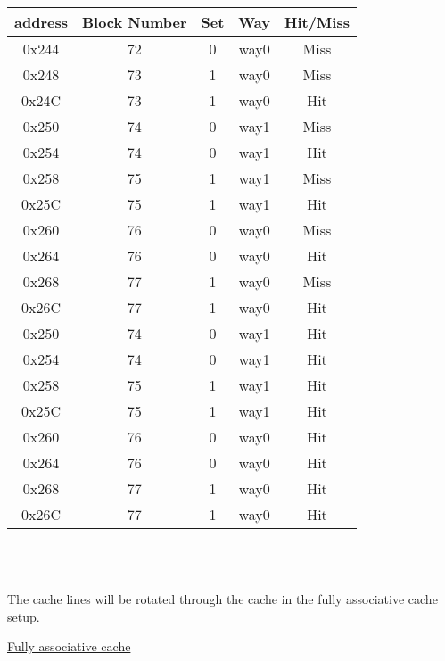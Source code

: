 \documentclass[11pt,reqno]{article}
\begin{document}
\begin{tabular}{| c | c | c | c | c |}
\hline
address & Block Number & Set & Way & Hit/Miss \\ \hline
0x244 & 72 & 0 & way0 & Miss \\ \hline
0x248 & 73 & 1 & way0 & Miss \\ \hline
0x24C & 73 & 1 & way0 & Hit \\ \hline
0x250 & 74 & 0 & way1 & Miss \\ \hline
0x254 & 74 & 0 & way1 & Hit \\ \hline
0x258 & 75 & 1 & way1 & Miss \\ \hline
0x25C & 75 & 1 & way1 & Hit \\ \hline
0x260 & 76 & 0 & way0 & Miss \\ \hline
0x264 & 76 & 0 & way0 & Hit \\ \hline
0x268 & 77 & 1 & way0 & Miss \\ \hline
0x26C & 77 & 1 & way0 & Hit \\ \hline
0x250 & 74 & 0 & way1 & Hit \\ \hline
0x254 & 74 & 0 & way1 & Hit \\ \hline
0x258 & 75 & 1 & way1 & Hit \\ \hline
0x25C & 75 & 1 & way1 & Hit \\ \hline
0x260 & 76 & 0 & way0 & Hit \\ \hline
0x264 & 76 & 0 & way0 & Hit \\ \hline
0x268 & 77 & 1 & way0 & Hit \\ \hline
0x26C & 77 & 1 & way0 & Hit \\ \hline
\end{tabular}\\
\newpage

\noindent{}\\ 

The cache lines will be rotated through the cache in the fully associative cache setup.

\noindent \underline{Fully associative cache}\\
\end{document}
